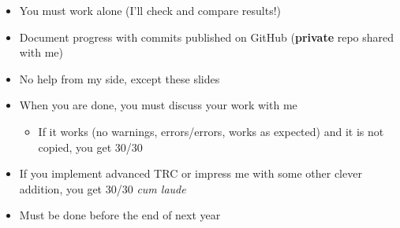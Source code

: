 \documentclass[
  letterpaper,
  DIV=11,
  numbers=noendperiod]{scrartcl}
\providecommand{\tightlist}{%
  \setlength{\itemsep}{0pt}\setlength{\parskip}{0pt}}
\begin{document}
\begin{itemize}
\tightlist
\item
  You must work alone (I'll check and compare results!)
\item
  Document progress with commits published on GitHub (\textbf{private}
  repo shared with me)
\item
  No help from my side, except these slides
\item
  When you are done, you must discuss your work with me

  \begin{itemize}
  \tightlist
  \item
    If it works (no warnings, errors/errors, works as expected) and it
    is not copied, you get 30/30
  \end{itemize}
\item
  If you implement advanced TRC or impress me with some other clever
  addition, you get 30/30 \emph{cum laude}
\item
  Must be done before the end of next year
\end{itemize}
\end{document}

